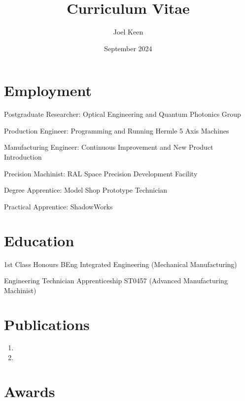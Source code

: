 \documentclass{cv}
\title{Curriculum Vitae}
\author{Joel Keen}
\date{September 2024}
\begin{document}


\maketitle

\section{Employment}

Postgraduate Researcher: Optical Engineering and Quantum Photonics Group

Production Engineer: Programming and Running Hermle 5 Axis Machines

Manufacturing Engineer: Continuous Improvement and New Product Introduction

Precision Machinist: RAL Space Precision Development Facility

Degree Apprentice: Model Shop Prototype Technician 

Practical Apprentice: ShadowWorks

\section{Education}

1st Class Honours BEng Integrated Engineering (Mechanical Manufacturing)

 Engineering Technician Apprenticeship ST0457 (Advanced Manufacturing Machinist)

\section{Publications}
\begin{enumerate}

\item{}

\item{}

\end{enumerate}

\section{Awards}
\end{document}

